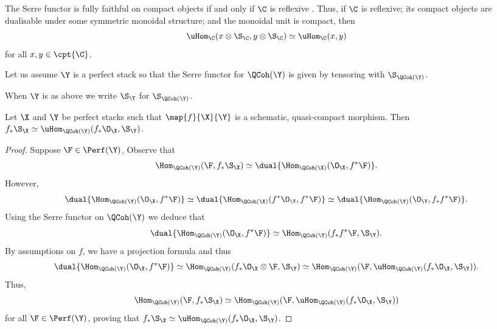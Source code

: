 \documentclass{amsart}
\begin{document}
  \sssec{}

  The Serre functor is fully faithful on compact objects
  if and only if \(\C\) is reflexive \cite[Proposition 1.2.6]{gaitsgory_yom_din:2017}.
  Thus, if \(\C\) is reflexive; its compact objects are dualisable
  under some symmetric monoidal structure; and the monoidal unit is compact, then
  \begin{displaymath}
    \uHom_\C(x \otimes \S_\C, y \otimes \S_\C) \simeq \uHom_\C(x,y)
  \end{displaymath}
  for all \(x,y \in \cpt{\C}\).


  \sssec{}

  Let us assume \(\Y\) is a perfect stack so that the
  Serre functor for \(\QCoh(\Y)\) is given by tensoring with
  \(\S_{\QCoh(\Y)}\).

  \begin{notat}
    When \(\Y\) is as above we write \(\S_\Y\) for \(\S_{\QCoh(\Y)}\).
  \end{notat}

  \begin{prop}\label{prop:serre_under_morphism}
    Let \(\X\) and \(\Y\) be perfect stacks such that \(\map{f}{\X}{\Y}\)
    is a schematic, quasi-compact morphism. 
    Then \(f_\ast \S_\X \simeq \uHom_{\QCoh(\Y)}(f_\ast \O_\X, \S_\Y)\).
  \end{prop}
  \begin{proof}
    Suppose \(\F \in \Perf(\Y)\), Observe that
    \begin{displaymath}
      \Hom_{\QCoh(\Y)}(\F, f_\ast \S_\X) \simeq \dual{\Hom_{\QCoh(\X)}(\O_\X, f^\ast \F)}.
    \end{displaymath}
    However,
    \begin{displaymath}
      \dual{\Hom_{\QCoh(\Y)}(\O_\X, f^\ast \F)} \simeq \dual{\Hom_{\QCoh(\X)}(f^\ast \O_\Y, f^\ast \F)} \simeq \dual{\Hom_{\QCoh(\Y)}(\O_\Y, f_\ast f^\ast \F)}.
    \end{displaymath}
    Using the Serre functor on \(\QCoh(\Y)\) we deduce that 
    \begin{displaymath}
      \dual{\Hom_{\QCoh(\Y)}(\O_\X, f^\ast \F)} \simeq \Hom_{\QCoh(\Y)}(f_\ast f^\ast \F, \S_\Y).
    \end{displaymath}
    By assumptions on \(f\), we have a projection formula and thus
    \begin{displaymath}
      \dual{\Hom_{\QCoh(\Y)}(\O_\X, f^\ast \F)} \simeq \Hom_{\QCoh(\Y)}(f_\ast \O_\X \otimes \F, \S_\Y) \simeq \Hom_{\QCoh(\Y)}(\F, \uHom_{\QCoh(\Y)}(f_\ast \O_\X, \S_\Y)).
    \end{displaymath}
    Thus,
    \begin{displaymath}
      \Hom_{\QCoh(\Y)}(\F, f_\ast \S_\X) \simeq \Hom_{\QCoh(\Y)}(\F, \uHom_{\QCoh(\Y)}(f_\ast \O_\X, \S_\Y))
    \end{displaymath}
    for all \(\F\in \Perf(\Y)\), proving that 
    \(f_\ast \S_\X \simeq \uHom_{\QCoh(\Y)}(f_\ast \O_\X, \S_\Y)\).
  \end{proof}
\end{document}
